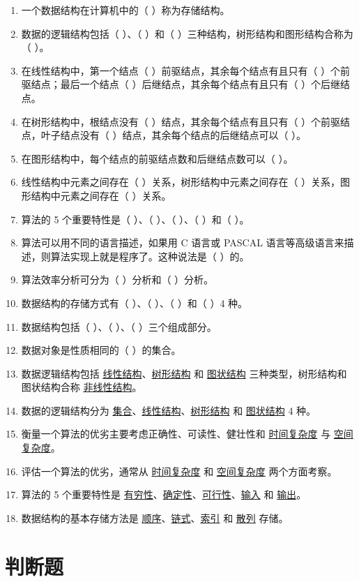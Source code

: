 \documentclass[12pt, a4paper]{article}
\begin{document}
\begin{enumerate}
	\item 一个数据结构在计算机中的（ ）称为存储结构。
	\item 数据的逻辑结构包括（ ）、（ ）和（ ）三种结构，树形结构和图形结构合称为（ ）。
	\item 在线性结构中，第一个结点（ ）前驱结点，其余每个结点有且只有（ ）个前驱结点；最后一个结点（ ）后继结点，其余每个结点有且只有（ ）个后继结点。
	\item 在树形结构中，根结点没有（ ）结点，其余每个结点有且只有（ ）个前驱结点，叶子结点没有（ ）结点，其余每个结点的后继结点可以（ ）。
	\item 在图形结构中，每个结点的前驱结点数和后继结点数可以（ ）。
	\item 线性结构中元素之间存在（ ）关系，树形结构中元素之间存在（ ）关系，图形结构中元素之间存在（ ）关系。
	\item 算法的 5 个重要特性是（ ）、（ ）、（ ）、（ ）和（ ）。
	\item 算法可以用不同的语言描述，如果用 C 语言或 PASCAL 语言等高级语言来描述，则算法实现上就是程序了。这种说法是（ ）的。
	\item 算法效率分析可分为（ ）分析和（ ）分析。
	\item 数据结构的存储方式有（ ）、（ ）、（ ）和（ ）4 种。
	\item 数据结构包括（ ）、（ ）、（ ）三个组成部分。
	\item 数据对象是性质相同的（ ）的集合。
	\item 数据逻辑结构包括 \underline{线性结构}、\underline{树形结构} 和 \underline{图状结构} 三种类型，树形结构和图状结构合称 \underline{非线性结构}。
	\item 数据的逻辑结构分为 \underline{集合}、\underline{线性结构}、\underline{树形结构} 和 \underline{图状结构} 4 种。
	\item 衡量一个算法的优劣主要考虑正确性、可读性、健壮性和 \underline{时间复杂度} 与 \underline{空间复杂度}。
	\item 评估一个算法的优劣，通常从 \underline{时间复杂度} 和 \underline{空间复杂度} 两个方面考察。
	\item 算法的 5 个重要特性是 \underline{有穷性}、\underline{确定性}、\underline{可行性}、\underline{输入} 和 \underline{输出}。
	\item 数据结构的基本存储方法是 \underline{顺序}、\underline{链式}、\underline{索引} 和 \underline{散列} 存储。
\end{enumerate}

\section*{判断题}
\end{document}
